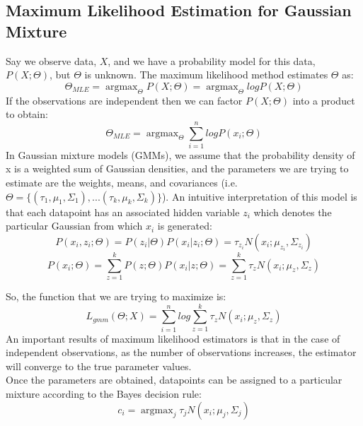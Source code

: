\documentclass{article}
\DeclareMathOperator*{\argmax}{argmax}
\begin{document}
\subsection{Maximum Likelihood Estimation for Gaussian Mixture}
\quad
Say we observe data, $X$, and we have a probability model for this data, $P(X;\Theta)$, but $\Theta$ is unknown. The maximum likelihood method estimates $\Theta$ as:
\[ \Theta_{MLE} = \argmax_{\Theta} P(X;\Theta)  = \argmax_{\Theta} log P(X;\Theta) \] \quad
If the observations are independent then we can factor $P(X;\Theta)$ into a product to obtain:
\[ \Theta_{MLE} = \argmax_{\Theta} \sum\limits_{i=1}^n log P(x_i;\Theta) \]
\noindent \quad
In Gaussian mixture models (GMMs), we assume that the probability density of x is a weighted sum of Gaussian densities, and the parameters we are trying to estimate are the weights, means, and covariances (i.e. $\Theta = \{ (\tau_1,\mu_1,\Sigma_1),... (\tau_k,\mu_k,\Sigma_k)\}$). An intuitive interpretation of this model is that each datapoint has an associated hidden variable $z_i$ which denotes the particular Gaussian from which $x_i$ is generated:
\[ P(x_i,z_i;\Theta) = P(z_i|\Theta)P(x_i|z_i;\Theta) = \tau_{z_i} N(x_i;\mu_{z_i}, \Sigma_{z_i})\]
\[ P(x_i;\Theta) = \sum\limits_{z=1}^k P(z;\Theta)P(x_i|z;\Theta) =  \sum\limits_{z=1}^k \tau_z N(x_i;\mu_z, \Sigma_z)\]

So, the function that we are trying to maximize is:
\begin{equation}
\label{eq:j_gmm}
L_{gmm}(\Theta; X) =  \sum\limits_{i=1}^n log  \sum\limits_{z=1}^k \tau_z N(x_i;\mu_z, \Sigma_z)
\end{equation}
\noindent \quad
An important results of maximum likelihood estimators is that in the case of independent observations, as the number of observations increases, the estimator will converge to the true parameter values.
\\ \null \quad Once the parameters are obtained, datapoints can be assigned to a particular mixture according to the Bayes decision rule:
\begin{equation}
\label{eq:bayes_asgn}
c_i = \argmax_j \tau_j N(x_i;\mu_j,\Sigma_j)
\end{equation}
\end{document}
